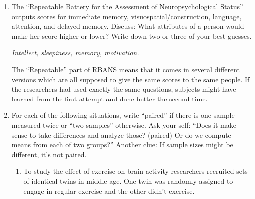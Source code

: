   \begin{enumerate}
  \item The ``Repeatable Battery for the Assessment of
    Neuropsychological Status'' outputs scores for immediate memory,
    visuospatial/construction, language, attention, and delayed
    memory.  Discuss: What attributes of a person would make her score
    higher or lower?  Write down two or three of your best guesses.
\begin{students}
    \vspace{2cm}    
\end{students}

\begin{key}
  {\it Intellect, sleepiness, memory, motivation.}
\end{key}





The ``Repeatable'' part of RBANS means that it comes in several
different versions which are all supposed to give the same scores to
the same people.  If the researchers had used exactly the same
questions, subjects might have learned from the first attempt and done
better the second time.


  \item  For each of the following situations, write ``paired'' if
    there is one sample measured twice or ``two samples'' otherwise.
    Ask your self: ``Does it make sense to take differences and
    analyze those? (paired) Or do we compute means from each of two groups?''
     Another clue: If sample sizes might be different, it's not
     paired. 
 
    \begin{enumerate}
    \item To study the effect of exercise on brain activity
      researchers recruited sets of identical twins in middle age.
      One twin was randomly assigned to engage in regular
      exercise and the other didn't exercise. 
\begin{students}
 \vspace{1cm}
\end{students}


\end{enumerate}
\end{enumerate}
